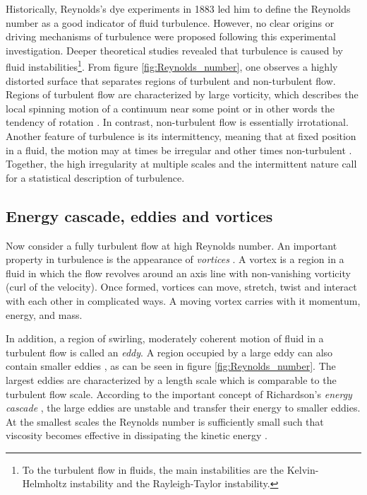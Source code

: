 Historically, Reynolds's dye experiments in 1883 led him to define the Reynolds number as a good indicator of fluid turbulence. However, no clear origins or driving mechanisms of turbulence were proposed following this experimental investigation. Deeper theoretical studies revealed that turbulence is caused by fluid instabilities\footnote{To the turbulent flow in fluids, the main instabilities are the Kelvin-Helmholtz instability and the Rayleigh-Taylor instability.}. From figure \ref{fig:Reynolds_number}, one observes a highly distorted surface that separates regions of turbulent and non-turbulent flow. Regions of turbulent flow are characterized by large vorticity, which describes the local spinning motion of a continuum near some point or in other words the tendency of rotation \cite{Acheson_1990_Turbulence}. In contrast, non-turbulent flow is essentially irrotational. Another feature of turbulence is its intermittency, meaning that at fixed position in a fluid, the motion may at times be irregular and other times non-turbulent \cite{Acheson_1990_Turbulence}. Together, the high irregularity at multiple scales and the intermittent nature call for a statistical description of turbulence.


\subsection{Energy cascade, eddies and vortices} \label{sec:turbulence_generation_and_consequences}

Now consider a fully turbulent flow at high Reynolds number. An important property in turbulence is the appearance of \emph{vortices} \cite{Ting_1991_Vortex}. A vortex is a region in a fluid in which the flow revolves around an axis line with non-vanishing vorticity (curl of the velocity). Once formed, vortices can move, stretch, twist and interact with each other in complicated ways. A moving vortex carries with it momentum, energy, and mass.

In addition, a region of swirling, moderately coherent motion of fluid in a turbulent flow is called an \emph{eddy}. A region occupied by a large eddy can also contain smaller eddies \cite{Pope_2000_Turbulence}, as can be seen in figure \ref{fig:Reynolds_number}. The largest eddies are characterized by a length scale which is comparable to the turbulent flow scale. According to the important concept of Richardson's \emph{energy cascade} \cite{Richardson_1922_Turbulence}, the large eddies are unstable and transfer their energy to smaller eddies. At the smallest scales the Reynolds number is sufficiently small such that viscosity becomes effective in dissipating the kinetic energy \cite{Pope_2000_Turbulence}.

